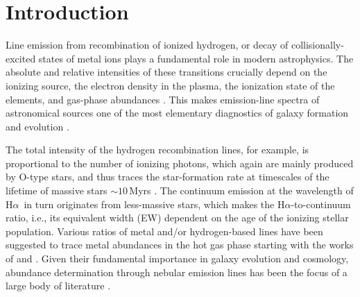 \documentclass[traditabstract]{aa}
\newcommand{\hb}{H$\beta$}
\newcommand{\ha}{H$\alpha$}
\newcommand{\hii}{\mbox{H\,{\sc ii}}}
\newcommand{\oiii}{[\ion{O}{iii}]}
\newcommand{\nii}{[\ion{N}{ii}]}
\begin{document}
\maketitle

\section{Introduction}
\label{sec:Intro}

Line emission from recombination of ionized hydrogen, or decay of collisionally-excited states of metal ions plays a fundamental role in modern astrophysics. The absolute and relative intensities of these transitions crucially depend on the ionizing source, the electron density in the plasma, the ionization state of the elements, and gas-phase abundances \citep{1989agna.book.....O}. This makes emission-line spectra of astronomical sources one of the most elementary diagnostics of galaxy formation and evolution \citep[e.g.,][]{2004ApJ...613..898T, 2006ApJ...644..813E, 2009ApJ...706.1364F}.


The total intensity of the hydrogen recombination lines, for example, is proportional to the number of ionizing photons, which again are mainly produced by O-type stars, and thus traces the star-formation rate at timescales of the lifetime of massive stars $\sim 10$\,Myrs \citep[e.g.,][]{1998ARA&A..36..189K}. The continuum emission at the wavelength of \ha\, in turn originates from less-massive stars, which makes the \ha-to-continuum ratio, i.e., its equivalent width (EW) dependent on the age of the ionizing stellar population. Various ratios of metal and/or hydrogen-based lines have been suggested to trace metal abundances in the hot gas phase starting with the works of \citet{1979MNRAS.189...95P} and \citet{1979A&A....78..200A}. Given their fundamental importance in galaxy evolution and cosmology, abundance determination through nebular emission lines has been the focus of a large body of literature \citep[e.g.,][]{2004ApJ...617..240K, 2005ApJ...631..231P, 2006A&A...454L.127S, 2006A&A...448..955I, 2008ApJ...681.1183K}.
\end{document}
